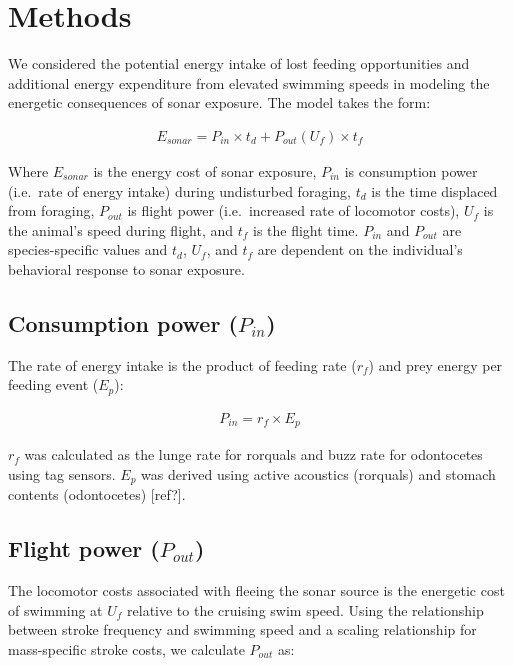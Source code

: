 \documentclass[]{elsarticle} %
\begin{document}
\section{Methods}\label{methods}

We considered the potential energy intake of lost feeding opportunities
and additional energy expenditure from elevated swimming speeds in
modeling the energetic consequences of sonar exposure. The model takes
the form:

\begin{align}
E_{sonar} = P_{in} \times t_d + P_{out}(U_f) \times t_f
\end{align}

Where \(E_{sonar}\) is the energy cost of sonar exposure, \(P_{in}\) is
consumption power (i.e.~rate of energy intake) during undisturbed
foraging, \(t_d\) is the time displaced from foraging, \(P_{out}\) is
flight power (i.e.~increased rate of locomotor costs), \(U_f\) is the
animal's speed during flight, and \(t_f\) is the flight time. \(P_{in}\)
and \(P_{out}\) are species-specific values and \(t_d\), \(U_f\), and
\(t_f\) are dependent on the individual's behavioral response to sonar
exposure.

\subsection{\texorpdfstring{Consumption power
(\(P_{in}\))}{Consumption power (P\_\{in\})}}\label{consumption-power-p_in}

The rate of energy intake is the product of feeding rate (\(r_f\)) and
prey energy per feeding event (\(E_p\)):

\begin{align}
P_{in} = r_f \times E_p
\end{align}

\(r_f\) was calculated as the lunge rate for rorquals and buzz rate for
odontocetes using tag sensors. \(E_p\) was derived using active
acoustics (rorquals) and stomach contents (odontocetes) {[}ref?{]}.

\subsection{\texorpdfstring{Flight power
(\(P_{out}\))}{Flight power (P\_\{out\})}}\label{flight-power-p_out}

The locomotor costs associated with fleeing the sonar source is the
energetic cost of swimming at \(U_f\) relative to the cruising swim
speed. Using the relationship between stroke frequency and swimming
speed and a scaling relationship for mass-specific stroke costs, we
calculate \(P_{out}\) as:
\end{document}
